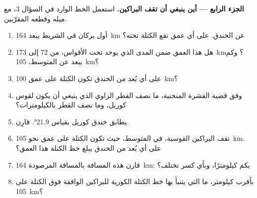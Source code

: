 \begin{problem}
\noindent\textbf{الجزء الرابع --- أين ينبغي أن تقف البراكين.} استعمل الخط الوارد في السؤال 3، مع ميله وقطعه المقرّبين.
\begin{enumerate}[resume]
  \item أول بركان في الشريط يبعد \qty{164}{km} عن الخندق. على أي عمق تقع الكتلة تحته؟
  \item هل هذا العمق ضمن المدى الذي يوجد تحت الأقواس، من 72 إلى \qty{173}{km}؟ وكم يبعد عن المتوسط، \qty{105}{km}؟
  \item على أي بُعد من الخندق تكون الكتلة على عمق \qty{100}{km}؟
  \item وفق قضية القشرة المنحنية، ما نصف القطر الزاوي الذي ينبغي أن يكون لقوس كوريل، وما نصف القطر بالكيلومترات؟
  \item يطابق خندق كوريل  بقياس \ang{21.9}. قارِن.
  \item تقف البراكين القوسية، في المتوسط، حيث تكون الكتلة على عمق نحو \qty{105}{km}. على أي بُعد من الخندق يبلغ خط الكتلة هذا العمق؟
  \item قارن هذه المسافة بالمسافة المرصودة \qty{164}{km}: بكم كيلومترًا، وبأي كسر تختلف؟
  \item بأقرب كيلومتر، ما  التي يتنبأ بها خط الكتلة الكورية للبراكين الواقفة فوق الكتلة على \qty{105}{km}؟
\end{enumerate}
\end{problem}
